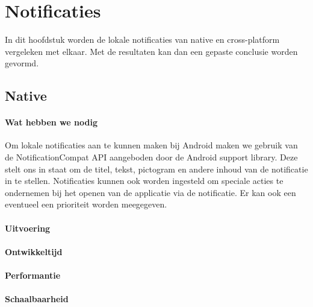 
\chapter{Notificaties}%
\label{ch:notificaties}

In dit hoofdstuk worden de lokale notificaties van native en cross-platform vergeleken met elkaar. 
Met de resultaten kan dan een gepaste conclusie worden gevormd.

\section{Native}
\subsubsection{Wat hebben we nodig}
Om lokale notificaties aan te kunnen maken bij Android maken we gebruik van de NotificationCompat API aangeboden 
door de Android support library. Deze stelt ons in staat om de titel, tekst, pictogram en andere inhoud van de 
notificatie in te stellen. Notificaties kunnen ook worden ingesteld om speciale acties te ondernemen bij het openen 
van de applicatie via de notificatie. Er kan ook een eventueel een prioriteit worden meegegeven.

\subsubsection{Uitvoering}



\subsubsection{Ontwikkeltijd}



\subsubsection{Performantie}



\subsubsection{Schaalbaarheid}

